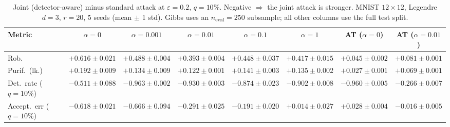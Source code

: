 \begin{table}[htbp]
  \centering
  \begin{tabular}{@{}lccccccc@{}}
    \toprule
    Metric & $\alpha{=}0$ & $\alpha{=}0.001$ & $\alpha{=}0.01$ & $\alpha{=}0.1$ & $\alpha{=}1$ & AT ($\alpha{=}0$) & AT ($\alpha{=}0.01$) \\
    \midrule
    Rob. & $+0.616 \pm 0.021$ & $+0.488 \pm 0.004$ & $+0.393 \pm 0.004$ & $+0.448 \pm 0.037$ & $+0.417 \pm 0.015$ & $+0.045 \pm 0.002$ & $+0.081 \pm 0.001$ \\
    Purif.\ (lk.) & $+0.192 \pm 0.009$ & $+0.134 \pm 0.009$ & $+0.122 \pm 0.001$ & $+0.141 \pm 0.003$ & $+0.135 \pm 0.002$ & $+0.027 \pm 0.001$ & $+0.069 \pm 0.001$ \\
    Det.\ rate ($q{=}10\%$) & $-0.511 \pm 0.088$ & $-0.963 \pm 0.002$ & $-0.930 \pm 0.003$ & $-0.874 \pm 0.023$ & $-0.902 \pm 0.008$ & $-0.960 \pm 0.005$ & $-0.266 \pm 0.007$ \\
    Accept.\ err ($q{=}10\%$) & $-0.618 \pm 0.021$ & $-0.666 \pm 0.094$ & $-0.291 \pm 0.025$ & $-0.191 \pm 0.020$ & $+0.014 \pm 0.027$ & $+0.028 \pm 0.004$ & $-0.016 \pm 0.005$ \\
    \bottomrule
  \end{tabular}
  \caption{Joint (detector-aware) minus standard attack at $\varepsilon=0.2$, $q{=}10\%$. Negative $\Rightarrow$ the joint attack is stronger. MNIST $12\times12$, Legendre $d{=}3$, $r{=}20$, 5 seeds (mean $\pm$ 1 std). Gibbs uses an $n_{\mathrm{eval}}=250$ subsample; all other columns use the full test split.}
  \label{tab:mnist_r12_joint_r20_eps0.2}
\end{table}
